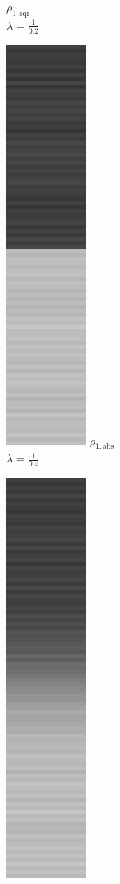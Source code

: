 \documentclass[onecolumn,final,a4paper,13pt,reqno]{siamart}
\begin{document}
\begin{figure}[t]
\begin{subfigure}[t]{0.08\textwidth}
		\scriptsize $\rho_{1,\text{sqr}}$\\[2px]
		\scriptsize $\lambda = \frac{1}{0.2}$
	\end{subfigure}
	\begin{subfigure}[t]{0.08\textwidth}
		\includegraphics[scale=0.3]{pictures/denoising/signal/ipiano_absolute_04.png}
		\scriptsize $\rho_{1,\text{abs}}$\\[2px]
		\scriptsize $\lambda = \frac{1}{0.4}$
	\end{subfigure}
	\begin{subfigure}[t]{0.08\textwidth}
		\includegraphics[scale=0.3]{pictures/denoising/signal/ipiano_squared_04.png}

\end{subfigure}
\end{figure}
\end{document}
